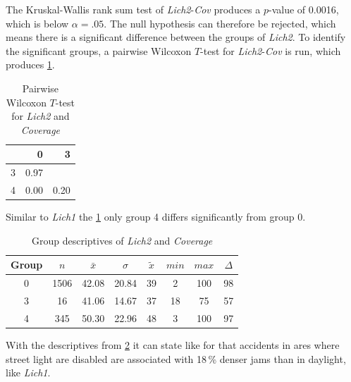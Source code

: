 The Kruskal-Wallis rank sum test of \textit{Lich2}-\textit{Cov} produces a $p$-value of 0.0016, which is below $\alpha=.05$. The null hypothesis can therefore be rejected, which means there is a significant difference between the groups of \textit{Lich2}. To identify the significant groups, a pairwise Wilcoxon $T$-test for \textit{Lich2}-\textit{Cov} is run, which produces \cref{tbl:wilcoxon_baysis_matched_Lich2_Cov}. 
\begin{table}[ht!]
	\tiny
	\centering
    \begin{tabular}{rrr}
        \toprule
        & 0 & 3 \\ 
        \midrule
        3 & 0.97 &  \\ 
        4 & 0.00 & 0.20 \\ 
        \hline
      \end{tabular}
	\caption{Pairwise Wilcoxon $T$-test for \textit{Lich2} and \textit{Coverage}}
	\label{tbl:wilcoxon_baysis_matched_Lich2_Cov}
\end{table}
Similar to \textit{Lich1} the \cref{tbl:wilcoxon_baysis_matched_Lich2_Cov} only group 4 differs significantly from group 0. 
\begin{table}[ht!]
	\tiny
	\centering
    \begin{tabular}{c|c|c|c|c|c|c|c}
        \toprule
        Group & $n$ & $\bar{x}$ & $\sigma$ & $\tilde{x}$ & $min$ & $max$ & $\Delta$ \\   
        \midrule
        0 & 1506 & 42.08 & 20.84 & 39 & 2  & 100 & 98 \\ 
        3 & 16   & 41.06 & 14.67 & 37 & 18 & 75  & 57 \\ 
        4 & 345  & 50.30 & 22.96 & 48 & 3  & 100 & 97 \\ 
        \bottomrule
      \end{tabular}
	\caption{Group descriptives of \textit{Lich2} and \textit{Coverage}}
	\label{tbl:descriptives_baysis_matched_Lich2_Cov}
\end{table}
With the descriptives from \cref{tbl:descriptives_baysis_matched_Lich2_Cov} it can state like for that accidents in ares where street light are disabled are associated with 18\,\% denser jams than in daylight, like \textit{Lich1}.

